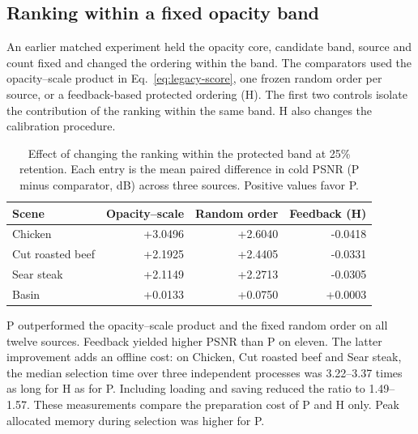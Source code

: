 \subsection{Ranking within a fixed opacity band}\label{sec:bridge}
An earlier matched experiment held the opacity core, candidate band, source and count fixed and changed the ordering within the band. The comparators used the opacity--scale product in Eq.~\eqref{eq:legacy-score}, one frozen random order per source, or a feedback-based protected ordering (H). The first two controls isolate the contribution of the ranking within the same band. H also changes the calibration procedure.
\begin{table}[htbp]
\centering
\caption{Effect of changing the ranking within the protected band at 25\% retention. Each entry is the mean paired difference in cold PSNR (P minus comparator, dB) across three sources. Positive values favor P.}\label{tab:scorebridge}
\begin{tabular}{lrrr}
\toprule
Scene & Opacity--scale & Random order & Feedback (H) \\
\midrule
Chicken & +3.0496 & +2.6040 & -0.0418 \\
Cut roasted beef & +2.1925 & +2.4405 & -0.0331 \\
Sear steak & +2.1149 & +2.2713 & -0.0305 \\
Basin & +0.0133 & +0.0750 & +0.0003 \\
\bottomrule
\end{tabular}
\end{table}

P outperformed the opacity--scale product and the fixed random order on all twelve sources. Feedback yielded higher PSNR than P on eleven. The latter improvement adds an offline cost: on Chicken, Cut roasted beef and Sear steak, the median selection time over three independent processes was 3.22--3.37 times as long for H as for P. Including loading and saving reduced the ratio to 1.49--1.57. These measurements compare the preparation cost of P and H only. Peak allocated memory during selection was higher for P.\par
